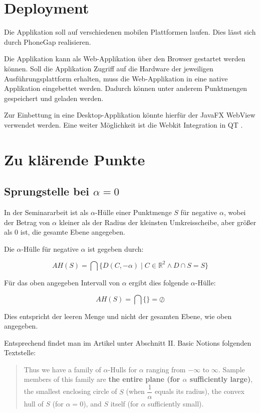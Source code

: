 \documentclass[12pt,a4paper]{scrartcl}
\begin{document}
\section*{Deployment}
Die Applikation soll auf verschiedenen mobilen Plattformen laufen. Dies lässt sich durch PhoneGap \cite{phone_gap}
realisieren.

Die Applikation kann als Web-Applikation über den Browser gestartet werden können. Soll die Applikation Zugriff
auf die Hardware der jeweiligen Ausführungsplattform erhalten, muss die Web-Applikation in eine native Applikation
eingebettet werden. Dadurch können unter anderem Punktmengen gespeichert und geladen werden.

Zur Einbettung in eine Desktop-Applikation könnte hierfür der JavaFX WebView \cite{javafx_webview} verwendet werden.
Eine weiter Möglichkeit ist die Webkit Integration in QT \cite{qt_webkit}.

\section*{Zu klärende Punkte}
\subsection*{Sprungstelle bei $\alpha = 0$}

In der Seminararbeit ist als $\alpha$-Hülle einer Punktmenge $S$ für negative $\alpha$, wobei der Betrag von
$\alpha$ kleiner als der Radius der kleinsten Umkreisscheibe, aber größer als $0$ ist, die gesamte Ebene angegeben.

Die $\alpha$-Hülle für negative $\alpha$ ist gegeben durch:

\begin{equation}
	AH(S) = \bigcap \lbrace D(C, -\alpha) \mid C \in \mathbb{R}^2 \wedge D \cap S = S \rbrace
\end{equation}

Für das oben angegeben Intervall von $\alpha$ ergibt dies folgende $\alpha$-Hülle:

\begin{equation}
	AH(S) = \bigcap \lbrace \rbrace = \oslash
\end{equation}

Dies entspricht der leeren Menge und nicht der gesamten Ebene, wie oben angegeben.

Entsprechend findet man im Artikel \cite{alpha1983} unter Abschnitt II. Basic Notions folgenden Textstelle:
\begin{quotation}
Thus we have a family of $\alpha$-Hulls for $\alpha$ ranging from $-\infty$ to $\infty$. Sample members of this
family are \textbf{the entire plane (for $\alpha$ sufficiently large)}, the smallest enclosing circle of $S$ (when 
$\dfrac{1}{\alpha}$ equals its radius), the convex hull of $S$ (for $\alpha = 0$), and $S$ itself (for
$\alpha$ sufficiently small).
\end{quotation}
\end{document}
